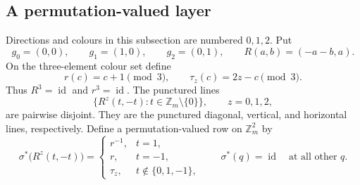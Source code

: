 \documentclass[11pt,reqno]{amsart}
\numberwithin{equation}{section}
\theoremstyle{definition}
\theoremstyle{remark}
\newcommand{\Zm}{\mathbb Z_m}
\newcommand{\id}{\operatorname{id}}
\begin{document}
\subsection{A permutation-valued layer}
Directions and colours in this subsection are numbered $0,1,2$. Put
\[
 g_0=(0,0),\qquad g_1=(1,0),\qquad g_2=(0,1),
 \qquad R(a,b)=(-a-b,a).
\]
On the three-element colour set define
\[
 r(c)=c+1\pmod3,\qquad \tau_z(c)=2z-c\pmod3.
\]
Thus $R^3=\id$ and $r^3=\id$. The punctured lines
\[
 \{R^z(t,-t):t\in\Zm\setminus\{0\}\},\qquad z=0,1,2,
\]
are pairwise disjoint. They are the punctured diagonal, vertical, and horizontal
lines, respectively. Define a permutation-valued row on $\Zm^2$ by
\begin{equation}\label{eq:star-row}
 \sigma^*\bigl(R^z(t,-t)\bigr)=
 \begin{cases}
 r^{-1},&t=1,\\
 r,&t=-1,\\
 \tau_z,&t\notin\{0,1,-1\},
 \end{cases}
 \qquad
 \sigma^*(q)=\id\quad\text{at all other }q.
\end{equation}
\end{document}
